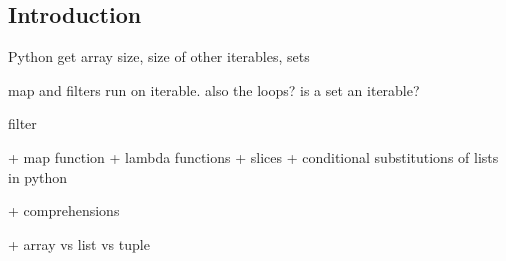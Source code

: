 
\subsection{Introduction}

Python get array size,  size of other iterables, sets

map and filters run on iterable. also the loops?
is a set an iterable?

filter

+ map function
+ lambda functions
+ slices
+ conditional substitutions of lists in python

+ comprehensions

+ array vs list vs tuple
